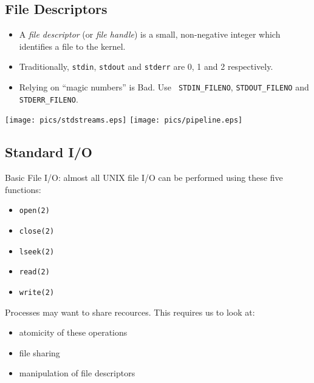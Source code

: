 \documentclass[xga]{xdvislides}
\begin{document}
\subsection{File Descriptors}
\begin{itemize}
	\item A {\em file descriptor} (or {\em file handle}) is a small,
		non-negative integer which identifies a file to the kernel.
	\item Traditionally, {\tt stdin}, {\tt stdout} and {\tt stderr}
		are 0, 1 and 2 respectively.
	\item Relying on ``magic numbers'' is Bad\texttrademark.  Use {\tt
		STDIN\_FILENO}, {\tt STDOUT\_FILENO} and {\tt STDERR\_FILENO}.
\end{itemize}
\texttt{[image: pics/stdstreams.eps]}
\texttt{[image: pics/pipeline.eps]}

\subsection{Standard I/O}
Basic File I/O: almost all UNIX file I/O can be
performed using these five functions:
\begin{itemize}
	\item {\tt open(2)}
	\item {\tt close(2)}
	\item {\tt lseek(2)}
	\item {\tt read(2)}
	\item {\tt write(2)}
\end{itemize}
\vspace{.25in}
Processes may want to share recources.  This requires us to look at:
\begin{itemize}
	\item atomicity of these operations
	\item file sharing
	\item manipulation of file descriptors
\end{itemize}
\end{document}
